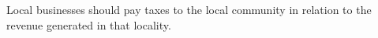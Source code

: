 Local businesses should pay taxes to the local community in relation to the revenue generated in that locality.
